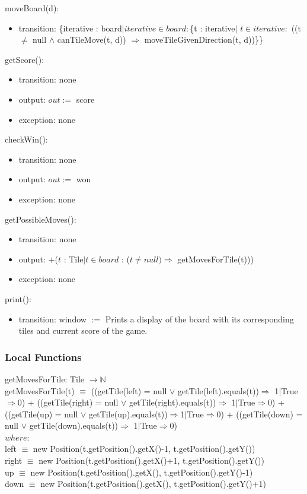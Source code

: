 \documentclass[12pt]{article}
\begin{document}
\noindent moveBoard(d):
\begin{itemize}
\item transition: \{iterative : board$| iterative \in board : $\{t : iterative$|$ $t \in iterative : $ ((t $\neq$ null $\land$ canTileMove(t, d)) $\Rightarrow$ moveTileGivenDirection(t, d))\}\}
\end{itemize}

\noindent getScore():
\begin{itemize}
\item transition: none
\item output: $out :=$ score
\item exception: none
\end{itemize}

\noindent checkWin():
\begin{itemize}
\item transition: none
\item output: $out :=$ won
\item exception: none
\end{itemize}

\noindent getPossibleMoves():
\begin{itemize}
\item transition: none
\item output: $+$($t$ : Tile$|$$t \in board$ : ($t \neq null) \Rightarrow$ getMovesForTile(t)))
\item exception: none
\end{itemize}

\noindent print():
\begin{itemize}
\item transition: window $:=$ Prints a display of the board with its corresponding tiles and current score of the game.
\end{itemize}

\subsubsection* {Local Functions}

getMovesForTile: Tile $\rightarrow \mathbb{N}$\\
\noindent getMovesForTile(t) $\equiv$ ((getTile(left) = null $\lor$ getTile(left).equals(t))$\Rightarrow$ 1$|$True$\Rightarrow$0) + ((getTile(right) = null $\lor$ getTile(right).equals(t))$\Rightarrow$ 1$|$True$\Rightarrow$0) + ((getTile(up) = null $\lor$ getTile(up).equals(t))$\Rightarrow $1$|$True$\Rightarrow$0) + ((getTile(down) = null $\lor$ getTile(down).equals(t))$\Rightarrow$ 1$|$True$\Rightarrow$0)\\
$where:$\\
left $\equiv$ new Position(t.getPosition().getX()-1, t.getPosition().getY())\\
right $\equiv$ new Position(t.getPosition().getX()+1, t.getPosition().getY())\\
up $\equiv$ new Position(t.getPosition().getX(), t.getPosition().getY()-1)\\
down $\equiv$ new Position(t.getPosition().getX(), t.getPosition().getY()+1)\\
\end{document}
